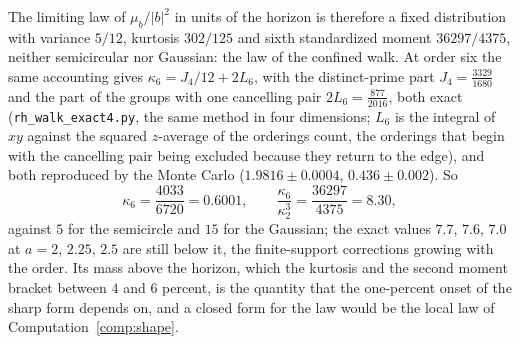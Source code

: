 \documentclass[11pt]{article}
\theoremstyle{definition}
\theoremstyle{remark}
\begin{document}
The limiting law of $\mu_b/|b|^2$ in units of the horizon is therefore a fixed distribution with variance $5/12$, kurtosis $302/125$ and sixth standardized moment $36297/4375$, neither semicircular nor Gaussian: the law of the confined walk. At order six the same accounting gives $\kappa_6=J_4/12+2L_6$, with the distinct-prime part $J_4=\tfrac{3329}{1680}$ and the part of the groups with one cancelling pair $2L_6=\tfrac{877}{2016}$, both exact (\texttt{rh\_walk\_exact4.py}, the same method in four dimensions; $L_6$ is the integral of $xy$ against the squared $z$-average of the orderings count, the orderings that begin with the cancelling pair being excluded because they return to the edge), and both reproduced by the Monte Carlo ($1.9816\pm0.0004$, $0.436\pm0.002$). So
\[
\kappa_6=\frac{4033}{6720}=0.6001,\qquad\frac{\kappa_6}{\kappa_2^3}=\frac{36297}{4375}=8.30,
\]
against $5$ for the semicircle and $15$ for the Gaussian; the exact values $7.7$, $7.6$, $7.0$ at $a=2$, $2.25$, $2.5$ are still below it, the finite-support corrections growing with the order. Its mass above the horizon, which the kurtosis and the second moment bracket between $4$ and $6$ percent, is the quantity that the one-percent onset of the sharp form depends on, and a closed form for the law would be the local law of Computation~\ref{comp:shape}.
\end{document}
